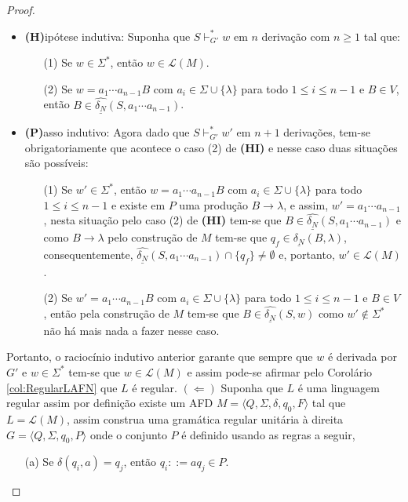 \begin{proof}
\begin{itemize}
		\item \textbf{(H)}ipótese indutiva: Suponha que $S \vdash^*_{G'} w$ em $n$ derivação com $n \geq 1$ tal que:
		\begin{itemize}
			\item[(1)] Se $w \in \Sigma^*$, então $w \in \mathcal{L}(M)$.
			\item[(2)] Se $w = a_1\cdots a_{n-1}B$ com $a_i \in \Sigma \cup \{\lambda\}$ para todo $1 \leq i \leq n-1$ e $B \in V$, então $B \in \widehat{\underline{\delta_N}}(S, a_1\cdots a_{n-1})$.
		\end{itemize}
		
		\item \textbf{(P)}asso indutivo: Agora dado que $S \vdash^*_{G'} w'$ em $n+1$ derivações, tem-se obrigatoriamente que acontece o caso (2) de \textbf{(HI)} e nesse caso duas situações são possíveis:
		\begin{itemize}
			\item[(1)] Se $w' \in \Sigma^*$, então $w = a_1\cdots a_{n-1}B$ com $a_i \in \Sigma \cup \{\lambda\}$ para todo $1 \leq i \leq n-1$ e existe em $P$ uma produção $B \rightarrow \lambda$, e assim, $w' = a_1\cdots a_{n-1}$, nesta situação pelo caso (2) de \textbf{(HI)} tem-se que $B \in \widehat{\underline{\delta_N}}(S, a_1\cdots a_{n-1})$ e como $B \rightarrow \lambda$ pelo construção de $M$ tem-se que $q_f \in \underline{\delta_N}(B, \lambda)$, consequentemente, $\widehat{\underline{\delta_N}}(S, a_1\cdots a_{n-1}) \cap \{q_f\} \neq \emptyset$ e, portanto, $w' \in \mathcal{L}(M)$.
			\item[(2)] Se $w' = a_1\cdots a_{n-1}B$ com $a_i \in \Sigma \cup \{\lambda\}$ para todo $1 \leq i \leq n-1$ e $B \in V$, então pela construção de $M$ tem-se que $B \in \widehat{\underline{\delta_N}}(S, w)$ como $w' \notin \Sigma^*$ não há mais nada a fazer nesse caso.
		\end{itemize}
	\end{itemize}
	Portanto, o raciocínio indutivo anterior garante que sempre que  $w$ é derivada por $G'$ e $w \in \Sigma^*$ tem-se que $w \in \mathcal{L}(M)$ e assim pode-se afirmar pelo Corolário \ref{col:RegularLAFN} que $L$ é regular. $(\Leftarrow)$ Suponha que $L$ é uma linguagem regular assim por definição existe um AFD $M = \langle Q, \Sigma, \delta, q_0, F \rangle$ tal que $L = \mathcal{L}(M)$, assim construa uma gramática regular unitária à direita $G = \langle Q, \Sigma, q_0, P \rangle$ onde o conjunto $P$ é definido usando as regras a seguir, 
	\begin{itemize}
		\item[(a)] Se $\delta(q_i, a) = q_j$, então $q_i ::= aq_j \in P$.

\end{itemize}
\end{proof}
